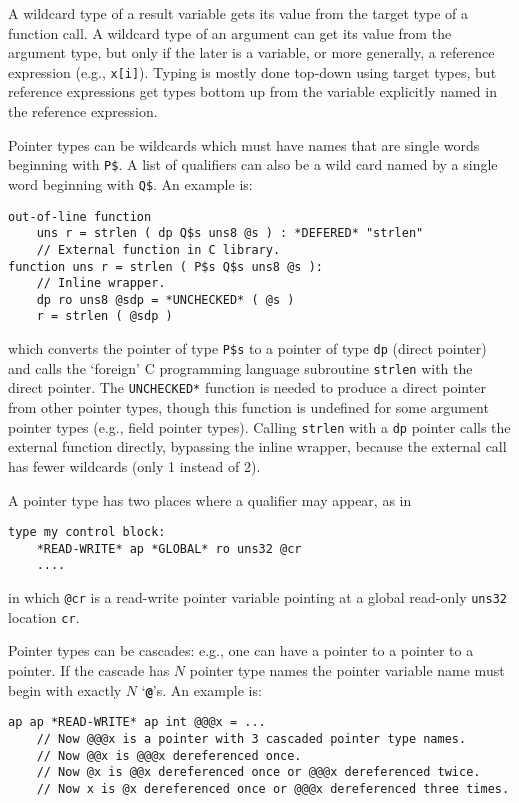 \documentclass[12pt]{article}
\newcommand{\TT}[1]{{\tt \bfseries #1}}
\newenvironment{indpar}[1][0.3in]%
	{\begin{list}{}%
		     {\setlength{\itemsep}{0in}%
		      \setlength{\topsep}{0in}%
		      \setlength{\parsep}{1ex}%
		      \setlength{\labelwidth}{#1}%
		      \setlength{\leftmargin}{#1}%
		      \addtolength{\leftmargin}{\labelsep}}%
	 \item}%
	{\end{list}}
\begin{document}
A wildcard type of a result variable gets its value from the
target type of a function call.  A wildcard type of an argument
can get its value from the argument type, but only if the
later is a variable, or more generally, a reference expression
(e.g., {\tt x[i]}).
Typing is mostly done top-down using target types, but reference
expressions get types bottom up from the variable explicitly named
in the reference expression.

Pointer types can be wildcards which must have names that are
single words beginning with {\tt P\$}.  A list of qualifiers
can also be a wild card named by a single word beginning with
{\tt Q\$}.  An example is:

\begin{indpar}\begin{verbatim}
out-of-line function
    uns r = strlen ( dp Q$s uns8 @s ) : *DEFERED* "strlen"
    // External function in C library.
function uns r = strlen ( P$s Q$s uns8 @s ):
    // Inline wrapper.
    dp ro uns8 @sdp = *UNCHECKED* ( @s )
    r = strlen ( @sdp )
\end{verbatim}\end{indpar}

which converts the pointer of type {\tt P\$s} to a pointer of
type {\tt dp} (direct pointer) and calls the `foreign' C programming
language subroutine {\tt strlen} with the direct pointer.
The {\tt *UNCHECKED*} function is needed to produce a direct pointer
from other pointer types, though this function is undefined
for some argument pointer types (e.g., field pointer types).
Calling {\tt strlen} with a {\tt dp} pointer calls the external
function directly, bypassing the inline wrapper, because the
external call has fewer wildcards (only 1 instead of 2).

A pointer type
has two places where a qualifier may appear, as in
\begin{indpar}\begin{verbatim}
type my control block:
    *READ-WRITE* ap *GLOBAL* ro uns32 @cr
    ....
\end{verbatim}\end{indpar}
in which {\tt @cr} is a read-write pointer variable pointing at a global
read-only {\tt uns32} location {\tt cr}.

Pointer types can be cascades: e.g., one can have a pointer to a pointer
to a pointer.  If the cascade has $N$ pointer type names the pointer
variable name must begin with exactly $N$ `\TT{@}'s.  An example is:
\begin{indpar}\begin{verbatim}
ap ap *READ-WRITE* ap int @@@x = ...
    // Now @@@x is a pointer with 3 cascaded pointer type names.
    // Now @@x is @@@x dereferenced once.
    // Now @x is @@x dereferenced once or @@@x dereferenced twice.
    // Now x is @x dereferenced once or @@@x dereferenced three times.
\end{verbatim}\end{indpar}
\end{document}
